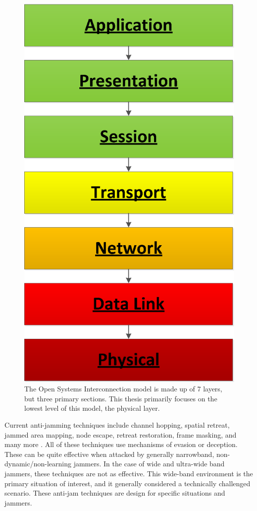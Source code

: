 \begin{figure}[!ht]\label{osi_model}
\centering
\includegraphics[scale=0.50]{OSI_model.eps}
\caption{The Open Systems Interconnection model is made up of 7 layers, but three primary sections.  This thesis primarily focuses on the lowest level of this model, the physical layer.}
\end{figure}

Current anti-jamming techniques include channel hopping, spatial retreat, jammed area mapping, node escape, retreat restoration, frame masking, and many more \cite{1}.  All of these techniques use mechanisms of evasion or deception.  These can be quite effective when attacked by generally narrowband, non-dynamic/non-learning jammers.  In the case of wide and ultra-wide band jammers, these techniques are not as effective.  This wide-band environment is the primary situation of interest, and it generally considered a technically challenged scenario.  These anti-jam techniques are design for specific situations and jammers.\\

